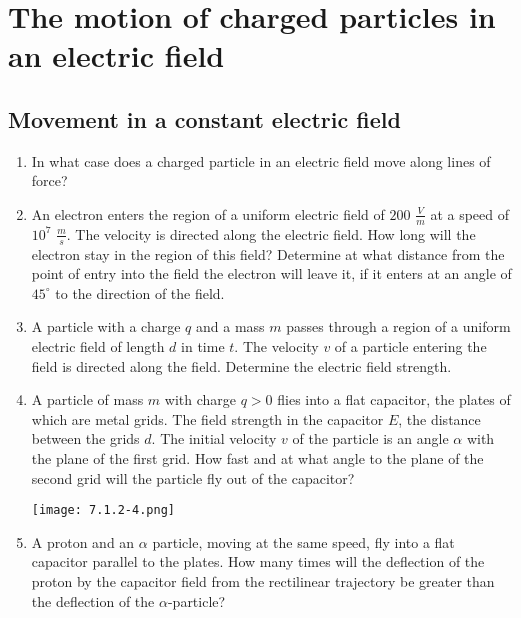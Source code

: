 \documentclass{article}
\begin{document}
\section{The motion of charged particles in an electric field}

\subsection{Movement in a constant electric field}
\begin{enumerate}[label=7.1.\arabic*]


\item In what case does a charged particle in an electric field move along lines of force?

\item An electron enters the region of a uniform electric field of $200$ $\frac{V}{m}$ at a speed of $10^7$ $\frac{m}{s}$. The velocity is directed along the electric field. How long will the electron stay in the region of this field? Determine at what distance from the point of entry into the field the electron will leave it, if it enters at an angle of $45^\circ$ to the direction of the field.

\item A particle with a charge $q$ and a mass $m$ passes through a region of a uniform electric field of length $d$ in time $t$. The velocity $v$ of a particle entering the field is directed along the field. Determine the electric field strength.

\item A particle of mass $m$ with charge $q > 0$ flies into a flat capacitor, the plates of which are metal grids. The field strength in the capacitor $E$, the distance between the grids $d$. The initial velocity $v$ of the particle is an angle $\alpha$ with the plane of the first grid. How fast and at what angle to the plane of the second grid will the particle fly out of the capacitor?

\begin{center}
    \texttt{[image: 7.1.2-4.png]}
\end{center}

\item A proton and an $\alpha$ particle, moving at the same speed, fly into a flat capacitor parallel to the plates. How many times will the deflection of the proton by the capacitor field from the rectilinear trajectory be greater than the deflection of the $\alpha$-particle?


\end{enumerate}
\end{document}
